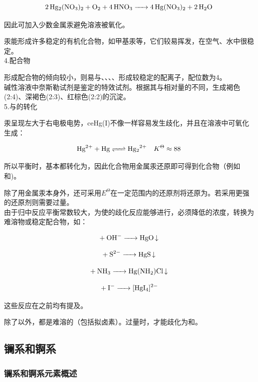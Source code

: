 \documentclass[a4paper,UTF8]{article}
\begin{document}
$$ \ce{2Hg2(NO3)2 + O2 + 4HNO3 -> 4Hg(NO3)2 + 2H2O} $$

因此可加入少数金属汞避免溶液被氧化。

汞能形成许多稳定的有机化合物，如甲基汞等，它们较易挥发，在空气、水中很稳定。\\

4.配合物

形成配合物的倾向较小，则易与、、、、形成较稳定的配离子，配位数为4。\\

碱性溶液中奈斯勒试剂是鉴定的特效试剂。根据其与相对量的不同，生成褐色(2:4)、深褐色(2:3)、红棕色(2:2)的沉淀。\\

5.与的转化

汞呈现左大于右电极电势，ce{Hg(I)}不像一样容易发生歧化，并且在溶液中可氧化生成：

$$ \ce{Hg^{2+} + Hg <=> Hg2^{2+}} \quad K^{\Theta} \approx 88$$

所以平衡时，基本都转化为，因此化合物用金属汞还原即可得到化合物（例如和)。

除了用金属汞本身外，还可采用$E^{\Theta}$在一定范围内的还原剂将还原为。若采用更强的还原剂则需要过量。\\

由于归中反应平衡常数较大，为使的歧化反应能够进行，必须降低的浓度，转换为难溶物或稳定配合物，如：

$$ \ce{+ OH- -> HgO\ce{v}} $$

$$ \ce{+ S^{2-} -> HgS\ce{v}} $$

$$ \ce{+ NH3 -> Hg(NH2)Cl\ce{v}} $$

$$ \ce{+ I- -> [HgI4]^{2-}} $$

这些反应在之前均有提及。

除了以外，都是难溶的（包括拟卤素）。过量时，才能歧化为和。

\subsection{镧系和锕系}

\subsubsection{镧系和锕系元素概述}
\end{document}
